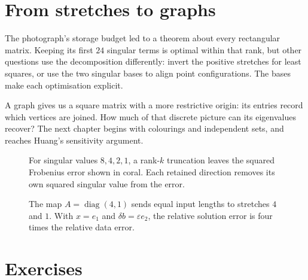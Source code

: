\section{From stretches to graphs}

The photograph's storage budget led to a theorem about every rectangular matrix. Keeping its first $24$ singular terms is optimal within that rank, but other questions use the decomposition differently: invert the positive stretches for least squares, or use the two singular bases to align point configurations. The bases make each optimisation explicit.

A graph gives us a square matrix with a more restrictive origin: its entries record which vertices are joined. How much of that discrete picture can its eigenvalues recover? The next chapter begins with colourings and independent sets, and reaches Huang's sensitivity argument.

\begin{figure}[ht]
\centering{}
\caption{For singular values $8,4,2,1$, a rank-$k$ truncation leaves the squared Frobenius error shown in coral. Each retained direction removes its own squared singular value from the error.}
\label{fig:v8c04budget}
\end{figure}
\begin{figure}[ht]
\centering{}
\caption{The map $A=\operatorname{diag}(4,1)$ sends equal input lengths to stretches $4$ and $1$. With $x=e_1$ and $\delta b=\varepsilon e_2$, the relative solution error is four times the relative data error.}
\label{fig:v8c04conditioning}
\end{figure}

\section{Exercises}

